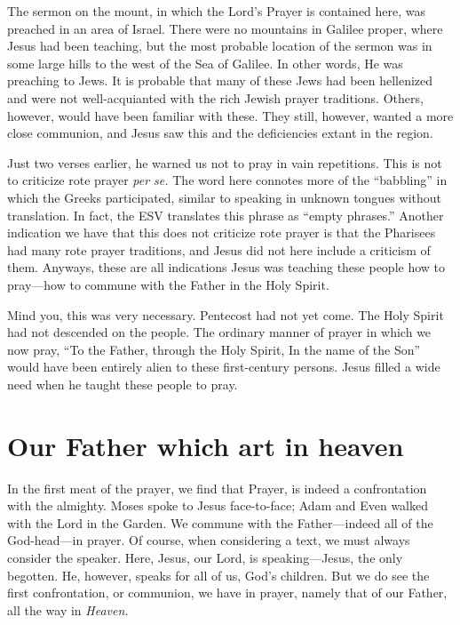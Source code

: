 \documentclass[12pt]{article}
\begin{document}
The sermon on the mount, in which the Lord's Prayer is contained here, was preached in an area of Israel.  There were no mountains in Galilee proper, where Jesus had been teaching, but the most probable location of the sermon was in some large hills to the west of the Sea of Galilee.  In other words, He was preaching to Jews.  It is probable that many of these Jews had been hellenized and were not well-acquianted with the rich Jewish prayer traditions.  Others, however, would have been familiar with these.  They still, however, wanted a more close communion, and Jesus saw this and the deficiencies extant in the region.

Just two verses earlier, he warned us not to pray in vain repetitions.  This is not to criticize rote prayer \emph{per se.}  The word here connotes more of the ``babbling'' in which the Greeks participated, similar to speaking in unknown tongues without translation.  In fact, the ESV translates this phrase as ``empty phrases.''  Another indication we have that this does not criticize rote prayer is that the Pharisees had many rote prayer traditions, and Jesus did not here include a criticism of them.  Anyways, these are all indications Jesus was teaching these people how to pray---how to commune with the Father in the Holy Spirit.

Mind you, this was very necessary.  Pentecost had not yet come.  The Holy Spirit had not descended on the people.  The ordinary manner of prayer in which we now pray, ``To the Father, through the Holy Spirit, In the name of the Son'' would have been entirely alien to these first-century persons.  Jesus filled a wide need when he taught these people to pray.

\section{Our Father which art in heaven}

In the first meat of the prayer, we find that Prayer, is indeed a confrontation with the almighty.  Moses spoke to Jesus face-to-face; Adam and Even walked with the Lord in the Garden.  We commune with the Father---indeed all of the God-head---in prayer.  Of course, when considering a text, we must always consider the speaker.  Here, Jesus, our Lord, is speaking---Jesus, the only begotten.  He, however, speaks for all of us, God's children.  But we do see the first confrontation, or communion, we have in prayer, namely that of our Father, all the way in \emph{Heaven.}
\end{document}
